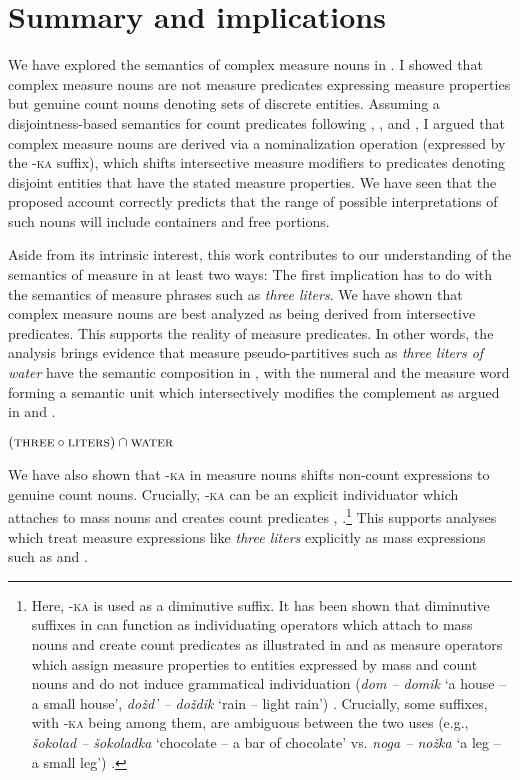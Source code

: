 \documentclass[output=paper]{langscibook}
\begin{document}
%
%

\section{Summary and implications}\label{sec:6}\largerpage

We have explored the semantics of complex measure nouns in . I showed that complex measure nouns are not measure predicates expressing measure properties but genuine count nouns denoting sets of discrete entities. Assuming a disjointness-based semantics for count predicates following \citet{Rothstein2010,Rothstein2011}, \citet{Rothstein2017}, and \citet{Landman2011,Landman2016}, I argued that complex measure nouns are derived via a nominalization operation (expressed by the -\textsc{ka} suffix), which shifts intersective measure modifiers to predicates denoting disjoint entities that have the stated measure properties. We have seen that the proposed account correctly predicts that the range of possible interpretations of such nouns will include containers and free portions.

Aside from its intrinsic interest, this work contributes to our understanding of the semantics of measure in at least two ways: The first implication has to do with the semantics of measure phrases such as \textit{three liters}. We have shown that complex measure nouns are best analyzed as being derived from intersective predicates. This supports the reality of measure predicates. In other words, the analysis brings evidence that measure pseudo-partitives such as \textit{three liters of water} have the semantic composition in , with the numeral and the measure word forming a semantic unit which intersectively modifies the complement as argued in \citet{Rothstein2009,Rothstein2011,Rothstein2017} and \citet{Landman2004,Landman2016}.

\ea\label{ex:khrizmann:41} $(\textsc{three}\circ\textsc{liters}) \cap\textsc{water}$
\z

\noindent We have also shown that -\textsc{ka} in measure nouns shifts non-count expressions to genuine count nouns. Crucially, -\textsc{ka} can be an explicit individuator which attaches to mass nouns and creates count predicates \citep{Khrizman2017} , .\footnote{Here, -\textsc{ka} is used as a diminutive suffix. It has been shown that diminutive suffixes in  can function as individuating operators which attach to mass nouns and create count predicates as illustrated in  and as measure operators which assign measure properties to entities expressed by mass and count nouns and do not induce grammatical individuation (\textit{dom -- domik} `a house -- a small house', \textit{\textit{dožd' -- doždik}} `rain -- light rain') \citep{Khrizman2017,Khrizman2019}. Crucially, some suffixes, with -\textsc{ka} being among them, are ambiguous between the two uses (e.g., \textit{šokolad -- šokoladka} `chocolate -- a bar of chocolate' vs. \textit{noga -- nožka} `a leg -- a small leg') \citep{Khrizman2019}.} This supports analyses which treat measure expressions like \textit{three liters} explicitly as mass expressions such as \citet{Khrizman.etal2015} and \citet{Landman2016}.
\end{document}
